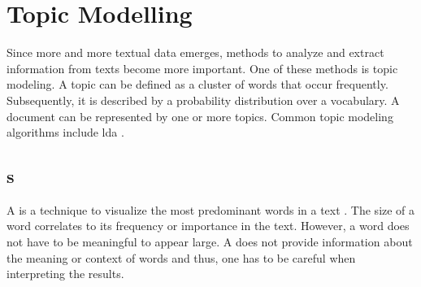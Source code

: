 \section{Topic Modelling}\label{sec:topic-modeling}

Since more and more textual data emerges, methods to analyze and extract information from texts become more important.
One of these methods is topic modeling.
A topic can be defined as a cluster of words that occur frequently.
Subsequently, it is described by a probability distribution over a vocabulary.
A document can be represented by one or more topics. %
Common topic modeling algorithms include \ac{lda} \cite{topic_modeling2015}.







\subsection{\wordcloud{}s}\label{subsec:word-clouds}

A \wordcloud{} is a technique to visualize the most predominant words in a text \cite{topic_modeling2019}.
The size of a word correlates to its frequency or importance in the text.
However, a word does not have to be meaningful to appear large.
A \wordcloud{} does not provide information about the meaning or context of words and thus, 
one has to be careful when interpreting the results.